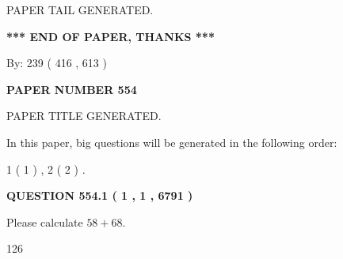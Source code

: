 \documentclass[12pt]{article}
\begin{document}
   
   
   
   
   
 \vspace{0.2in}
 
   
   
\vspace{2.0in} PAPER TAIL GENERATED.
   
   
   
   
\vspace{1.0in} 
{\textbf{\large{ *** END OF PAPER, THANKS *** }}} 
   
   
\hspace{1.0in} By: 
 239 ( 416 ,  613 )
   
   
   
   
\newpage 
\setcounter{page}{ 
   554001 } 
   
   
   
   
 {\textbf{ \Large{ PAPER NUMBER  554  }}}
   
   
\vspace{0.2in}
   
   
   
   
   
   
   
   
 \vspace{0.2in}
 
 
 
 
   
   
 PAPER TITLE GENERATED.
   
   
   
\vspace{0.2in}
   
In this paper, big questions will be generated in the following order: 
   
   
   1 ( 1 )
 ,
   2 ( 2 )
 .
  
\vspace{0.2in}
  
{\textbf{\Large{QUESTION
554.1 
 ( 1 , 1 , 6791 )
}}}
  
  
 
Please calculate $ %
58 +  %
68 $.
 
 
 
\noindent{}
 
 

126
 
 
\noindent{}
 
\end{document}
